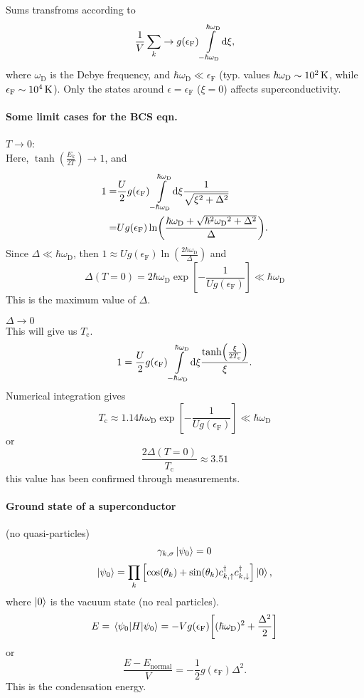 \documentclass[11pt,letter, swedish, english, twocolumn
]{article}
\newcommand{\Tc}{\ensuremath{{T_{\text{c}}}}}
\newcommand{\eF}{\ensuremath{{\epsilon_{\text{F}}}}}
\newcommand{\wD}{\ensuremath{{\omega_{\text{D}}}}}
\begin{document}
Sums transfroms according to
\begin{equation}
\frac{1}{V}\sum_k \to g(\eF)\int_{-\hbar\wD}^{\hbar\wD}\!\rd\xi,
\end{equation}
where $\wD$ is the Debye frequency, and $\hbar\wD\ll\eF$ (typ. values
$\hbar\wD\sim\unit[10^2]{K}$, while $\eF\sim\unit[10^4]{K}$). Only the
states around $\epsilon=\eF$ ($\xi=0$) affects superconductivity. 

\paragraph{Some limit cases for the BCS eqn.}
\mbox{}

$T\to0$:\\
Here, $\tanh(\frac{E_k}{2T})\to1$, and
\begin{equation}
\begin{aligned}
1=&\frac{U}{2}g(\eF)\int_{-\hbar\wD}^{\hbar\wD}\!\rd\xi
\frac{1}{\sqrt{\xi^2+\Delta^2}}\\
=&Ug(\eF)\ln(\frac{\hbar\wD+\sqrt{\hbar^2\wD^2+\Delta^2}}{\Delta}).
\end{aligned}
\end{equation}
Since $\Delta\ll\hbar\wD$, then $1\approx
Ug(\eF)\ln(\frac{2\hbar\wD}{\Delta})$ and
\begin{equation}
\Delta(T=0)=2\hbar\wD \exp[-\frac{1}{Ug(\eF)}]\ll\hbar\wD
\end{equation}
This is the maximum value of $\Delta$.

$\Delta\to0$\\
This will give us $\Tc$.
\begin{equation}
1=\frac{U}{2}g(\eF)\int_{-\hbar\wD}^{\hbar\wD}\!\rd\xi
\frac{\tanh(\frac{\xi}{2\Tc})}{\xi}.
\end{equation}
Numerical integration gives
\begin{equation}
\Tc\approx 1.14\hbar\wD \exp[-\frac{1}{Ug(\eF)}]\ll\hbar\wD
\end{equation}
or
\begin{equation}
\frac{2\Delta(T=0)}{\Tc}\approx 3.51
\end{equation}
this value has been confirmed through measurements.

\paragraph{Ground state of a superconductor} (no quasi-particles)
\begin{equation}
\gamma_{k,\sigma}\ket{\psi_0}=0
\end{equation}
\begin{equation}
\ket{\psi_0}=\prod_k \qty[
\cos(\theta_k)+\sin(\theta_k)c_{k,\uparrow}^\dagger
c_{k,\downarrow}^\dagger
]\ket{0},
\end{equation}
where $\ket{0}$ is the vacuum state (no real particles).
\begin{equation}
E=\ev{H}{\psi_0}=-Vg(\eF)\qty[(\hbar\wD)^2+\frac{\Delta^2}{2}]
\end{equation}
or
\begin{equation}
\frac{E-E_\text{normal}}{V}=-\frac{1}{2}g(\eF)\Delta^2.
\end{equation}
This is the condensation energy.
\end{document}
